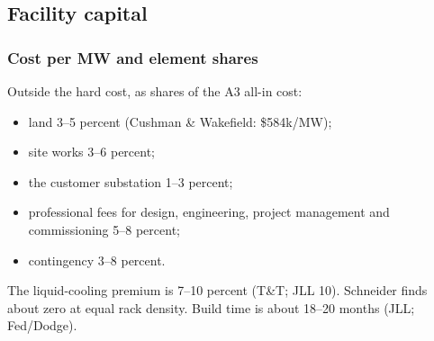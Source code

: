 \subsection{Facility capital}

\subsubsection{Cost per MW and element shares}

\begin{table}[ht]\centering\small
\caption{Facility capex per MW of IT load, US, \$m}\label{tab:capex}
\end{table}

Outside the hard cost, as shares of the A3 all-in cost:
\begin{itemize}
  \item land 3--5 percent (Cushman \& Wakefield: \$584k/MW);
  \item site works 3--6 percent;
  \item the customer substation 1--3 percent;
  \item professional fees for design, engineering, project management and commissioning 5--8
    percent;
  \item contingency 3--8 percent.
\end{itemize}
The liquid-cooling premium is 7--10 percent (T\&T; JLL 10). Schneider finds about zero at equal
rack density. Build time is about 18--20 months (JLL; Fed/Dodge).

